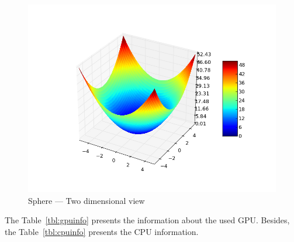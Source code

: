 \documentclass[conference]{IEEEtran}
\begin{document}
     \begin{figure}[!htb]
        \centering
        \includegraphics[width=\columnwidth]{../img/sphere.png}
        \caption{Sphere --- Two dimensional view}
        \label{fig:sphere}
    \end{figure}


    The Table~\ref{tbl:gpuinfo} presents the information about the used GPU.
    Besides, the Table~\ref{tbl:cpuinfo} presents the CPU information.
\end{document}
